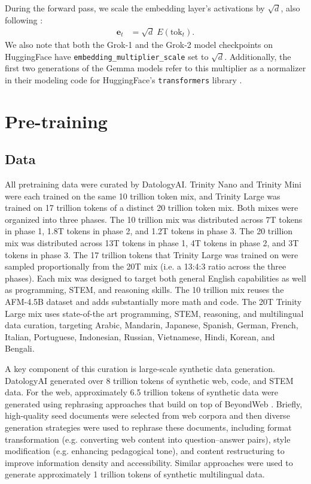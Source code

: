\documentclass{article}
\begin{document}
During the forward pass, we scale the embedding layer's activations by $\sqrt{d}$, also following \cite{takase2025spikemorestabilizingpretraining}:
\begin{align}
\mathbf{e}_t &= \sqrt{d}\;E(\mathrm{tok}_t).
\tag{39}
\end{align}
We also note that both the Grok-1 and the Grok-2 model checkpoints on HuggingFace \citep{xai_grok1_hf, xai_grok2_hf} have \texttt{embedding\_multiplier\_scale} set to $\sqrt{d}$. Additionally, the first two generations of the Gemma models \citep{gemmateam2024gemmaopenmodelsbased, gemmateam2024gemma2improvingopen} refer to this multiplier as a normalizer in their modeling code for HuggingFace's \texttt{transformers} library \citep{huggingface_transformers_github}.

\section{Pre-training}

\subsection{Data}

All pretraining data were curated by DatologyAI. Trinity Nano and Trinity Mini were each trained on the same 10 trillion token mix, and Trinity Large was trained on 17 trillion tokens of a distinct 20 trillion token mix. Both mixes were organized into three phases. The 10 trillion mix was distributed across 7T tokens in phase 1, 1.8T tokens in phase 2, and 1.2T tokens in phase 3. The 20 trillion mix was distributed across 13T tokens in phase 1, 4T tokens in phase 2, and 3T tokens in phase 3. The 17 trillion tokens that Trinity Large was trained on were sampled proportionally from the 20T mix (i.e. a 13:4:3 ratio across the three phases). Each mix was designed to target both general English capabilities as well as programming, STEM, and reasoning skills. The 10 trillion mix reuses the AFM-4.5B dataset and adds substantially more math and code. The 20T Trinity Large mix uses state-of-the art programming, STEM, reasoning, and multilingual data curation, targeting Arabic, Mandarin, Japanese, Spanish, German, French, Italian, Portuguese, Indonesian, Russian, Vietnamese, Hindi, Korean, and Bengali.

A key component of this curation is large-scale synthetic data generation. DatologyAI generated over 8 trillion tokens of synthetic web, code, and STEM data. For the web, approximately 6.5 trillion tokens of synthetic data were generated using rephrasing approaches that build on top of BeyondWeb \citep{maini2025beyondweb}. Briefly, high-quality seed documents were selected from web corpora and then diverse generation strategies were used to rephrase these documents, including format transformation (e.g. converting web content into question–answer pairs), style modification (e.g. enhancing pedagogical tone), and content restructuring to improve information density and accessibility. Similar approaches were used to generate approximately 1 trillion tokens of synthetic multilingual data.
\end{document}
